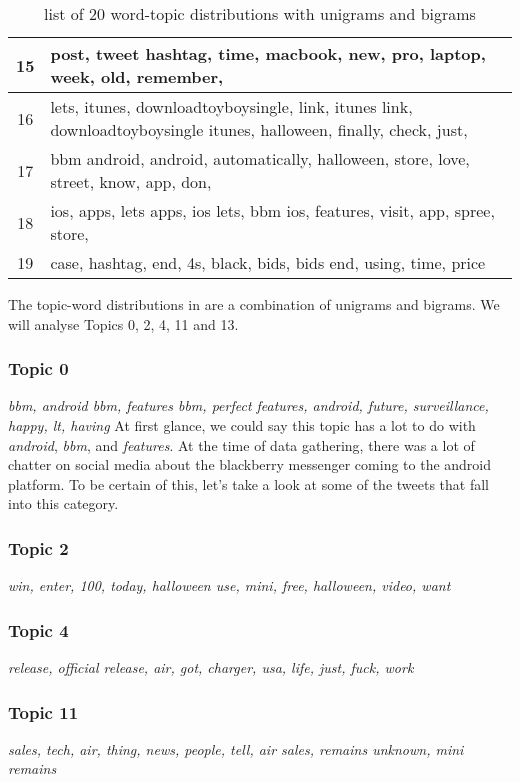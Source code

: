 \begin{table}
\begin{tabular}{c p{16cm}}
    15    & post, tweet hashtag, time, macbook, new, pro, laptop, week, old, remember, \\ \midrule
    16    & lets, itunes, downloadtoyboysingle, link, itunes link, downloadtoyboysingle itunes, halloween, finally, check, just, \\ \midrule
    17    & bbm android, android, automatically, halloween, store, love, street, know, app, don, \\ \midrule
    18    & ios, apps, lets apps, ios lets, bbm ios, features, visit, app, spree, store, \\ \midrule
    19    & case, hashtag, end, 4s, black, bids, bids end, using, time, price \\ \bottomrule
  \end{tabular}
  \caption{list of 20 word-topic distributions with unigrams and bigrams}
  \label{tab:unigrams_bigrams_lda}
\end{table}

The topic-word distributions in  are a combination of unigrams
and bigrams. We will analyse Topics 0, 2, 4, 11 and 13.


\subsubsection{Topic 0}
\label{sec:topic_0}
\textit{bbm, android bbm, features bbm, perfect features, android, future, surveillance, happy, lt,
having}
At first glance, we could say this topic has a lot to do with \textit{android}, \textit{bbm}, and
\textit{features}. At the time of data gathering, there was a lot of chatter on social media about
the blackberry messenger coming to the android platform. To be certain of this, let's take a look at
some of the tweets that fall into this category.

\subsubsection{Topic 2}
\label{sec:topic_2}
\textit{win, enter, 100, today, halloween use, mini, free, halloween, video, want}

\subsubsection{Topic 4}
\label{sec:topic_4}
\textit{release, official release, air, got, charger, usa, life, just, fuck, work}

\subsubsection{Topic 11}
\label{sec:topic_11}
\textit{sales, tech, air, thing, news, people, tell, air sales, remains unknown, mini remains}

